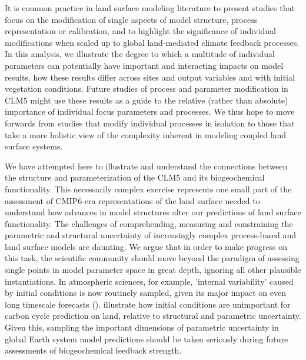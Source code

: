 \usepackage{}\documentclass[draft,linenumbers]{agujournal}
\begin{document}
It is common practice in land surface modeling literature to present studies that focus on the modification of single aspects of model structure, process representation or calibration, and to highlight the significance of individual modifications when scaled up to global land-mediated climate feedback processes. In this analysis, we illustrate the degree to which a multitude of individual parameters can potentially have important and interacting impacts on model results, how these results differ across sites and output variables and with initial vegetation conditions.  Future studies of process and parameter modification in CLM5 might use these results as a guide to the relative (rather than absolute) importance of individual focus parameters and processes. We thus hope to move forwards from studies that modify individual processes in isolation to those that take a more holistic view of the complexity inherent in modeling coupled land surface systems.

We have attempted here to illustrate and understand the connections between the structure and parameterization of the CLM5 and its biogeochemical functionality. This necessarily complex exercise represents one small part of the assessment of CMIP6-era representations of the land surface needed to understand how advances in model structures alter our predictions of land surface functionality.  The challenges of comprehending, measuring and constraining the parametric and structural uncertainty of increasingly complex process-based and land surface models are daunting. We argue that in order to make progress on this task, the scientific community should move beyond the paradigm of assessing single points in model parameter space in great depth, ignoring all other plausible instantiations. In atmospheric sciences, for example, 'internal variability' caused by initial conditions is now routinely sampled, given its major impact on even long timescale forecasts (\cite{kay2015}). \cite{bonan2018} illustrate how initial conditions are unimportant for carbon cycle prediction on land, relative to structural and parametric uncertainty. Given this, sampling the important dimensions of parametric uncertainty in global Earth system model predictions should be taken seriously during future assessments of biogeochemical feedback strength.
\end{document}

